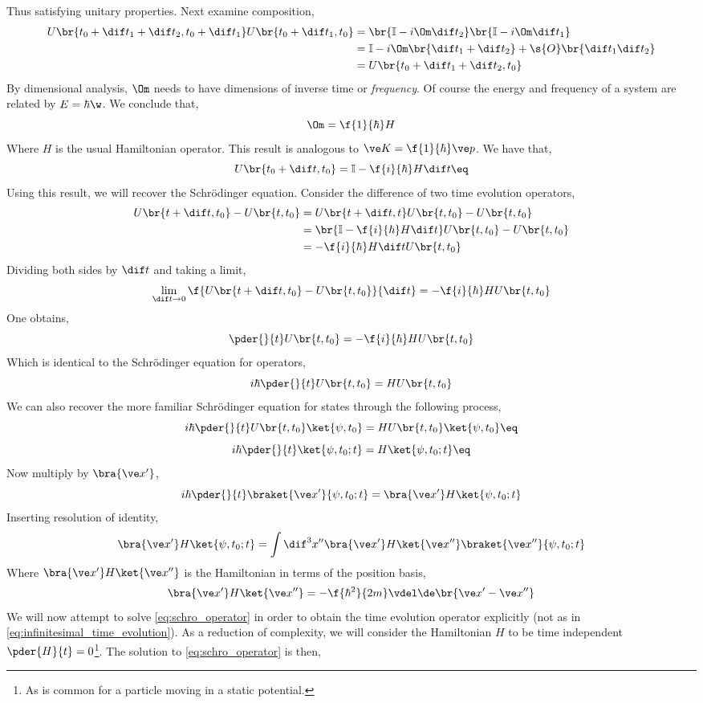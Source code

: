 \documentclass{article}
\begin{document}
Thus satisfying unitary properties. Next examine composition,
\begin{align*}
U\br{t_0 + \dif t_1 + \dif t_2, t_0 + \dif t_1}U\br{t_0 + \dif t_1, t_0} &= \br{\mathbb{I} - i \Om \dif t_2}\br{\mathbb{I} - i \Om \dif t_1} \\
&= \mathbb{I} - i \Om\br{\dif t_1 + \dif t_2} + \s{O}\br{\dif t_1 \dif t_2} \\
&= U\br{t_0 + \dif t_1 + \dif t_2, t_0}
\end{align*}
By dimensional analysis, $\Om$ needs to have dimensions of inverse time or \textit{frequency}. Of course the energy and frequency of a system are related by $E = \hbar \w$. We conclude that,
\[ \Om = \f{1}{\hbar} H \]
Where $H$ is the usual Hamiltonian operator. This result is analogous to $\ve K = \f{1}{\hbar} \ve p$. We have that,
\[ U\br{t_0+\dif t, t_0} = \mathbb{I} - \f{i}{\hbar} H \dif t \eq \label{eq:infinitesimal_time_evolution}\]
Using this result, we will recover the Schrödinger equation. Consider the difference of two time evolution operators,
\begin{align*}
    U\br{t+\dif t, t_0} - U\br{t, t_0} &= U\br{t+\dif t, t}U\br{t,t_0} - U\br{t, t_0}\\
    &= \br{\mathbb{I} - \f{i}{\hbar} H \dif t}U\br{t,t_0} - U\br{t, t_0}\\
    &= - \f{i}{\hbar} H \dif t U\br{t,t_0}
\end{align*}
Dividing both sides by $\dif t$ and taking a limit,
\[ \lim_{\dif t \to 0}\f{U\br{t+\dif t, t_0} - U\br{t, t_0}}{\dif t} = - \f{i}{\hbar} H U\br{t, t_0} \]
One obtains,
\[ \pder{}{t}U\br{t, t_0} = - \f{i}{\hbar} H U\br{t, t_0} \]
Which is identical to the Schrödinger equation for operators,
\[ i\hbar\pder{}{t}U\br{t, t_0} = H U\br{t, t_0} \]
We can also recover the more familiar Schrödinger equation for states through the following process,
\[ i\hbar\pder{}{t}U\br{t, t_0}\ket{\psi, t_0} = H U\br{t, t_0}\ket{\psi, t_0} \eq \label{eq:schro_operator}\]
\[ i\hbar\pder{}{t}\ket{\psi, t_0; t} = H\ket{\psi, t_0; t} \eq \label{eq:schro_state}\]
Now multiply by $\bra{\ve x'}$,
\[ i\hbar\pder{}{t}\braket{\ve x'}{\psi, t_0; t} = \bra{\ve x'}H\ket{\psi, t_0; t} \]
Inserting resolution of identity,
\[ \bra{\ve x'}H\ket{\psi, t_0; t} = \int \dif^3 x'' \bra{\ve x'}H \ket{\ve x''}\braket{\ve x''}{\psi, t_0 ; t}\]
Where $\bra{\ve x'}H \ket{\ve x''}$ is the Hamiltonian in terms of the position basis,
\[ \bra{\ve x'}H \ket{\ve x''} = -\f{\hbar^2}{2m} \vdel \de\br{\ve x' - \ve x''} \]
We will now attempt to solve \cref{eq:schro_operator} in order to obtain the time evolution operator explicitly (not as in \cref{eq:infinitesimal_time_evolution}). As a reduction of complexity, we will consider the Hamiltonian $H$ to be time independent $\pder{H}{t} = 0$\footnote{As is common for a particle moving in a static potential.}. The solution to \cref{eq:schro_operator} is then,
\end{document}
